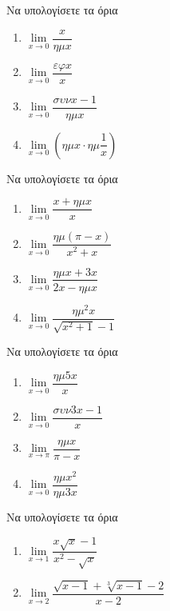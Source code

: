 \documentclass{presentation}
\begin{document}
\begin{askisi}
  Να υπολογίσετε τα όρια
  \begin{enumerate}
    \item $\lim\limits_{x \to 0}{ \dfrac{x}{ημx} }$ \pause
    \item $\lim\limits_{x \to 0}{ \dfrac{εφx}{x} }$ \pause
    \item $\lim\limits_{x \to 0}{ \dfrac{συνx-1}{ημx} }$ \pause
    \item $\lim\limits_{x \to 0}{ \left( ημx\cdot ημ\dfrac{1}{x} \right) }$
  \end{enumerate}

\end{askisi}

\begin{askisi}
  Να υπολογίσετε τα όρια
  \begin{enumerate}
    \item $\lim\limits_{x \to 0}{ \dfrac{x+ημx}{x} }$ \pause
    \item $\lim\limits_{x \to 0}{ \dfrac{ημ(π-x)}{x^2+x} }$ \pause
    \item $\lim\limits_{x \to 0}{ \dfrac{ημx+3x}{2x-ημx} }$ \pause
    \item $\lim\limits_{x \to 0}{ \dfrac{ημ^2x}{\sqrt{x^2+1}-1} }$
  \end{enumerate}

\end{askisi}

\begin{askisi}
  Να υπολογίσετε τα όρια
  \begin{enumerate}
    \item $\lim\limits_{x \to 0}{ \dfrac{ημ5x}{x} }$ \pause
    \item $\lim\limits_{x \to 0}{ \dfrac{συν3x-1}{x} }$ \pause
    \item $\lim\limits_{x \to π}{ \dfrac{ημx}{π-x} }$ \pause
    \item $\lim\limits_{x \to 0}{ \dfrac{ημx^2}{ημ3x} }$
  \end{enumerate}

\end{askisi}

\begin{askisi}
  Να υπολογίσετε τα όρια
  \begin{enumerate}
    \item $\lim\limits_{x \to 1}{ \dfrac{x\sqrt{x}-1}{x^2-\sqrt{x}} }$ \pause
    \item $\lim\limits_{x \to 2}{ \dfrac{\sqrt{x-1}+\sqrt[3]{x-1}-2}{x-2} }$
  \end{enumerate}

\end{askisi}
\end{document}
